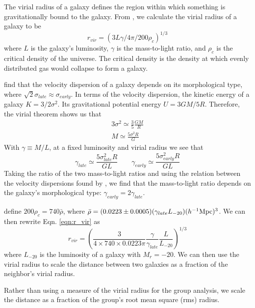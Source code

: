 The virial radius of a galaxy defines the region within which something is 
gravitationally bound to the galaxy.  From \cite{Hwang10}, we calculate the 
virial radius of a galaxy to be
\begin{equation}\label{eqn:r_vir}
    r_{vir} = (3L\gamma/4\pi/200\rho_c)^{1/3}
\end{equation}
where $L$ is the galaxy's luminosity, $\gamma$ is the mass-to-light ratio, and 
$\rho_c$ is the critical density of the universe.  The critical density is the 
density at which evenly distributed gas would collapse to form a galaxy.  

\cite{Choi07} find that the velocity dispersion of a galaxy depends on its 
morphological type, where $\sqrt{2}\sigma_{late} \approx \sigma_{early}$.  In 
terms of the velocity dispersion, the kinetic energy of a galaxy 
$K = 3/2 \sigma^2$.  Its gravitational potential energy $U = 3GM/5R$.  
Therefore, the virial theorem shows us that
\begin{align}
    3\sigma^2 \simeq \frac{3}{5} \frac{GM}{R}\nonumber \\
    M \simeq \frac{5\sigma^2 R}{G}
\end{align}
With $\gamma \equiv M/L$, at a fixed luminosity and virial radius we see that
\begin{equation}
    \gamma_{late} \simeq \frac{5\sigma_{late}^2 R}{GL} \qquad \gamma_{early} \simeq \frac{5\sigma_{early}^2 R}{GL}
\end{equation}
Taking the ratio of the two mass-to-light ratios and using the relation between 
the velocity dispersions found by \cite{Choi07}, we find that the mass-to-light 
ratio depends on the galaxy's morphological type: 
$\gamma_{early} = 2\gamma_{late}$.

\cite{Hwang10} define $200\rho_c = 740\bar{\rho}$, where 
$\bar{\rho} = (0.0223\pm 0.0005)(\gamma_{late}L_{-20})(\text{$h^{-1}$Mpc})^3$.  We can 
then rewrite Eqn. \ref{eqn:r_vir} as
\begin{equation}
    r_{vir} = \left( \frac{3}{4\times 740\times 0.0223\pi} \frac{\gamma}{\gamma_{late}} \frac{L}{L_{-20}} \right)^{1/3}
\end{equation}
where $L_{-20}$ is the luminosity of a galaxy with $M_r = -20$.  We can then use 
the virial radius to scale the distance between two galaxies as a fraction of 
the neighbor's virial radius.

Rather than using a measure of the virial radius for the group analysis, we 
scale the distance as a fraction of the group's root mean square (rms) radius.


